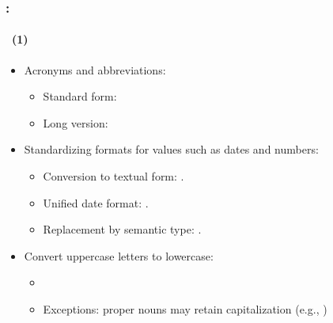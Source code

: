 \documentclass[xcolor=table]{beamer}
\begin{document}
\begin{frame}
	\frametitle{\insertshortsubtitle: \insertsection}
	\framesubtitle{\insertsubsection\ (1)}
	
	\begin{itemize}
		\item Acronyms and abbreviations:
		\begin{itemize}
			\item Standard form: 
			\item Long version: 
		\end{itemize}
		
		\item Standardizing formats for values such as dates and numbers:
		\begin{itemize}
			\item Conversion to textual form: .
			\item Unified date format: .
			\item Replacement by semantic type: .
		\end{itemize}
		
		\item Convert uppercase letters to lowercase:
		\begin{itemize}
			\item {}
			\item Exceptions: proper nouns may retain capitalization (e.g., )
		\end{itemize}
	\end{itemize}

\end{frame}
\end{document}
